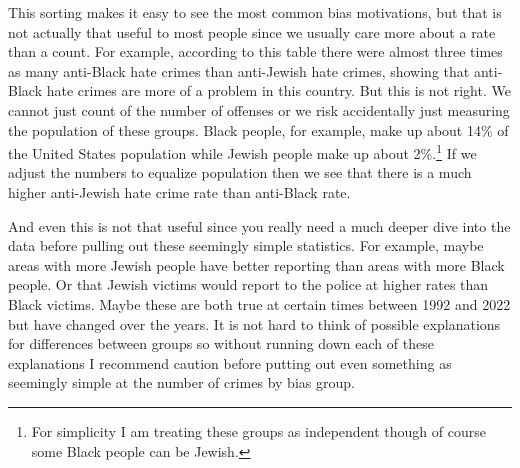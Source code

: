 \documentclass[
]{krantz}
\begin{document}
This sorting makes it easy to see the most common bias
motivations, but that is not actually that useful to most
people since we usually care more about a rate than a count.
For example, according to this table there were almost three
times as many anti-Black hate crimes than anti-Jewish hate
crimes, showing that anti-Black hate crimes are more of a
problem in this country. But this is not right. We cannot
just count of the number of offenses or we risk accidentally
just measuring the population of these groups. Black people,
for example, make up about 14\% of the United States
population while Jewish people make up about 2\%.\footnote{For
  simplicity I am treating these groups as independent
  though of course some Black people can be Jewish.} If we
adjust the numbers to equalize population then we see that
there is a much higher anti-Jewish hate crime rate than
anti-Black rate.

And even this is not that useful since you really need a
much deeper dive into the data before pulling out these
seemingly simple statistics. For example, maybe areas with
more Jewish people have better reporting than areas with
more Black people. Or that Jewish victims would report to
the police at higher rates than Black victims. Maybe these
are both true at certain times between 1992 and 2022 but
have changed over the years. It is not hard to think of
possible explanations for differences between groups so
without running down each of these explanations I recommend
caution before putting out even something as seemingly
simple at the number of crimes by bias group.
\end{document}
